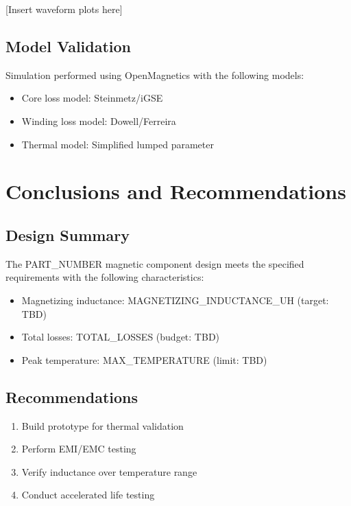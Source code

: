 \documentclass[11pt,a4paper]{article}
\begin{document}
[Insert waveform plots here]

\subsection{Model Validation}
Simulation performed using OpenMagnetics with the following models:
\begin{itemize}
    \item Core loss model: Steinmetz/iGSE
    \item Winding loss model: Dowell/Ferreira
    \item Thermal model: Simplified lumped parameter
\end{itemize}

\section{Conclusions and Recommendations}

\subsection{Design Summary}
The {{PART_NUMBER}} magnetic component design meets the specified requirements with the following characteristics:
\begin{itemize}
    \item Magnetizing inductance: {{MAGNETIZING_INDUCTANCE_UH}} (target: TBD)
    \item Total losses: {{TOTAL_LOSSES}} (budget: TBD)
    \item Peak temperature: {{MAX_TEMPERATURE}} (limit: TBD)
\end{itemize}

\subsection{Recommendations}
\begin{enumerate}
    \item Build prototype for thermal validation
    \item Perform EMI/EMC testing
    \item Verify inductance over temperature range
    \item Conduct accelerated life testing
\end{enumerate}
\end{document}
